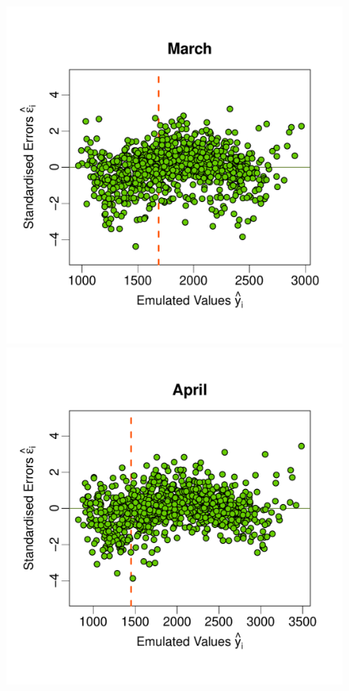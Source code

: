 \documentclass[a4paper, 12pt]{article}
\begin{document}
\begin{figure}
 \includegraphics[width=\scale]{Validation_Plots/Test_Set/Test_Scatter_03_Mar}\\[-3ex]
 \includegraphics[width=\scale]{Validation_Plots/Test_Set/Test_Scatter_04_Apr}\hspace{-1ex}

\end{figure}
\end{document}
